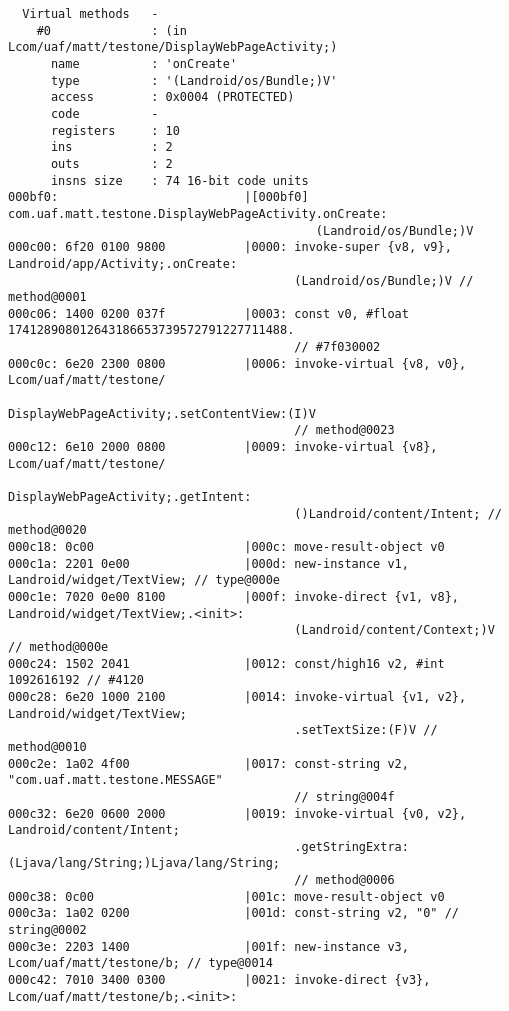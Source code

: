 \begin{lstlisting}
  Virtual methods   -
    #0              : (in Lcom/uaf/matt/testone/DisplayWebPageActivity;)
      name          : 'onCreate'
      type          : '(Landroid/os/Bundle;)V'
      access        : 0x0004 (PROTECTED)
      code          -
      registers     : 10
      ins           : 2
      outs          : 2
      insns size    : 74 16-bit code units
000bf0:                          |[000bf0] com.uaf.matt.testone.DisplayWebPageActivity.onCreate:
                                           (Landroid/os/Bundle;)V
000c00: 6f20 0100 9800           |0000: invoke-super {v8, v9}, Landroid/app/Activity;.onCreate:
                                        (Landroid/os/Bundle;)V // method@0001
000c06: 1400 0200 037f           |0003: const v0, #float 174128908012643186653739572791227711488.
                                        // #7f030002
000c0c: 6e20 2300 0800           |0006: invoke-virtual {v8, v0}, Lcom/uaf/matt/testone/
                                        DisplayWebPageActivity;.setContentView:(I)V
                                        // method@0023
000c12: 6e10 2000 0800           |0009: invoke-virtual {v8}, Lcom/uaf/matt/testone/
                                        DisplayWebPageActivity;.getIntent:
                                        ()Landroid/content/Intent; // method@0020
000c18: 0c00                     |000c: move-result-object v0
000c1a: 2201 0e00                |000d: new-instance v1, Landroid/widget/TextView; // type@000e
000c1e: 7020 0e00 8100           |000f: invoke-direct {v1, v8}, Landroid/widget/TextView;.<init>:
                                        (Landroid/content/Context;)V // method@000e
000c24: 1502 2041                |0012: const/high16 v2, #int 1092616192 // #4120
000c28: 6e20 1000 2100           |0014: invoke-virtual {v1, v2}, Landroid/widget/TextView;
                                        .setTextSize:(F)V // method@0010
000c2e: 1a02 4f00                |0017: const-string v2, "com.uaf.matt.testone.MESSAGE"
                                        // string@004f
000c32: 6e20 0600 2000           |0019: invoke-virtual {v0, v2}, Landroid/content/Intent;
                                        .getStringExtra:(Ljava/lang/String;)Ljava/lang/String;
                                        // method@0006
000c38: 0c00                     |001c: move-result-object v0
000c3a: 1a02 0200                |001d: const-string v2, "0" // string@0002
000c3e: 2203 1400                |001f: new-instance v3, Lcom/uaf/matt/testone/b; // type@0014
000c42: 7010 3400 0300           |0021: invoke-direct {v3}, Lcom/uaf/matt/testone/b;.<init>:

\end{lstlisting}

